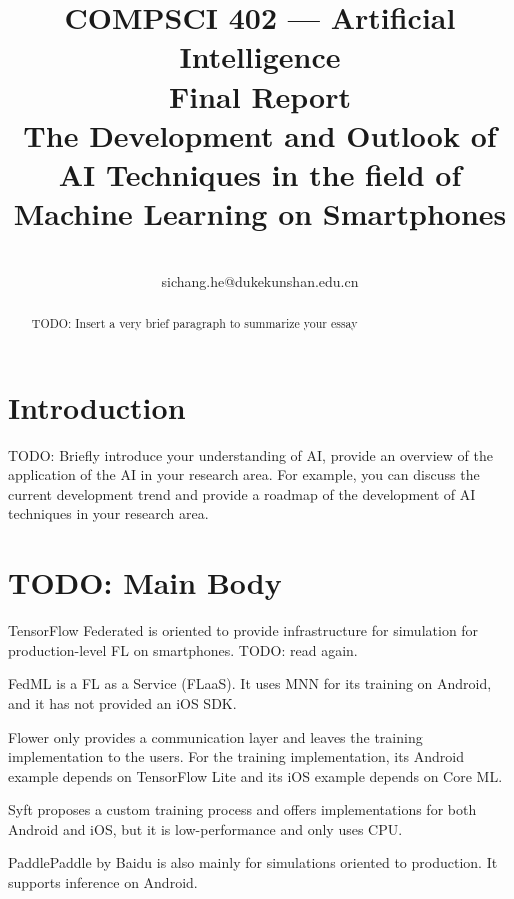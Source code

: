 \documentclass[conference]{IEEEtran}
\begin{document}
\title{
    COMPSCI 402 --- Artificial Intelligence\\
    Final Report\\
    The Development and Outlook of AI Techniques in the field of
    Machine Learning on Smartphones
}

\author{
    \\
    sichang.he@dukekunshan.edu.cn
}

\maketitle

\begin{abstract}
TODO: Insert a very brief paragraph to summarize your essay
\end{abstract}

\section{Introduction}

TODO: Briefly introduce your understanding of AI,
provide an overview of the application of the AI in your research area.
For example, you can discuss the current development trend and
provide a roadmap of the development of AI techniques in your research area.

\section{TODO: Main Body}

TensorFlow Federated \cite{bonawitz2019towards} is oriented to
provide infrastructure for simulation for production-level FL on smartphones.
TODO: read again.

FedML \cite{he2020fedml} is a FL as a Service (FLaaS).
It uses MNN for its training on Android,
and it has not provided an iOS SDK.

Flower \cite{beutel2020flower,mathur2021ondevice}
only provides a communication layer and
leaves the training implementation to the users.
For the training implementation,
its Android example depends on TensorFlow Lite and
its iOS example depends on Core ML.

Syft \cite{ryffel2018generic,Ziller2021,hall2021syft}
proposes a custom training process and
offers implementations for both Android and iOS,
but it is low-performance and only uses CPU.

PaddlePaddle \cite{ma2019paddlepaddle} by Baidu is
also mainly for simulations oriented to production.
It supports inference on Android.
\end{document}
